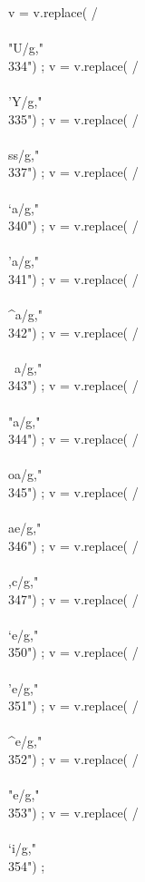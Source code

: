 {      v = v.replace(  /\\\\"U/g,"\\334") ;
      v = v.replace(  /\\\\'Y/g,"\\335") ;
      v = v.replace(  /\\\\ss/g,"\\337") ;
      v = v.replace(  /\\\\`a/g,"\\340") ;
      v = v.replace(  /\\\\'a/g,"\\341") ;
      v = v.replace(  /\\\\^a/g,"\\342") ;
      v = v.replace(  /\\\\~a/g,"\\343") ;
      v = v.replace(  /\\\\"a/g,"\\344") ;
      v = v.replace(  /\\\\oa/g,"\\345") ;
      v = v.replace(  /\\\\ae/g,"\\346") ;
      v = v.replace(  /\\\\,c/g,"\\347") ;
      v = v.replace(  /\\\\`e/g,"\\350") ;
      v = v.replace(  /\\\\'e/g,"\\351") ;
      v = v.replace(  /\\\\^e/g,"\\352") ;
      v = v.replace(  /\\\\"e/g,"\\353") ;
      v = v.replace(  /\\\\`i/g,"\\354") ;
}
